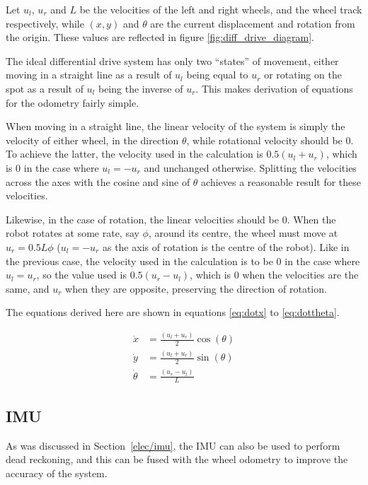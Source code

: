 Let $u_l$, $u_r$ and $L$ be the velocities of the left and right wheels, and the
wheel track respectively, while $(x, y)$ and $\theta$ are the current displacement
and rotation from the origin. These values are reflected in figure \ref{fig:diff_drive_diagram}.

The ideal differential drive system has only two ``states'' of movement, either
moving in a straight line as a result of $u_l$ being equal to $u_r$ or rotating on
the spot as a result of $u_l$ being the inverse of $u_r$. This makes derivation of
equations for the odometry fairly simple.

When moving in a straight line, the linear velocity of the system is simply the
velocity of either wheel, in the direction $\theta$, while rotational velocity
should be $0$. To achieve the latter, the velocity used in the calculation is $0.5 (u_l + u_r)$, which is $0$ in the case where $u_l = -u_r$ and unchanged otherwise.
Splitting the velocities across the axes with the cosine and sine of $\theta$ achieves a reasonable result for these velocities.

Likewise, in the case of rotation, the linear velocities should be $0$. When the
robot rotates at some rate, say $\phi$, around its centre, the wheel must move at $u_r = 0.5 L \phi$ ($u_l = -u_r$ as the axis of rotation is the centre of the
robot). Like in the previous case, the velocity used in the calculation is to be 0
in the case where $u_l = u_r$, so the value
used is $0.5 (u_r - u_l)$, which is $0$ when the velocities are the same, and $u_r$ when they are opposite, preserving the direction of rotation.

The equations derived here are shown in equations \ref{eq:dotx} to \ref{eq:dottheta}.


\begin{align}
\dot{x} & = \frac{(u_l + u_r)}{2} \cos(\theta) \label{eq:dotx} \\
\dot{y} & = \frac{(u_l + u_r)}{2} \sin(\theta) \label{eq:doty} \\
\dot{\theta} & = \frac{(u_r - u_l)}{L} \label{eq:dottheta}
\end{align}

\subsection{IMU}\label{soft/odometry/imu}

As was discussed in Section~\ref{elec/imu}, the IMU can also be used to
perform dead reckoning, and this can be fused with the wheel odometry to
improve the accuracy of the system.

